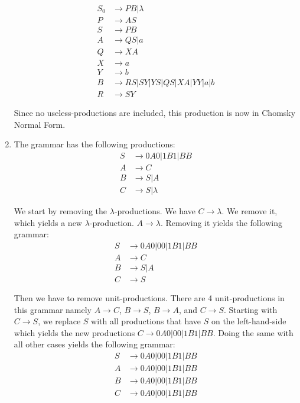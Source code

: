 \begin{enumerate}[label={(\alph*)}]
    \begin{align*}
        S_0 &\rightarrow PB | \lambda\\
        P &\rightarrow AS\\
        S &\rightarrow PB\\
        A &\rightarrow QS | a\\
        Q &\rightarrow XA\\
        X &\rightarrow a\\
        Y &\rightarrow b\\
        B &\rightarrow RS | SY | YS | QS | XA | YY | a | b\\
        R &\rightarrow SY
    \end{align*}
    
    \noindent Since no useless-productions are included, this production is now in Chomsky Normal Form.
    
    \item The grammar has the following productions:\\
    \begin{align*}
        S &\rightarrow 0A0 | 1B1 | BB\\
        A &\rightarrow C\\
        B &\rightarrow S | A\\
        C &\rightarrow S | \lambda
    \end{align*}
    
    \noindent We start by removing the $\lambda$-productions. We have $C \rightarrow \lambda$. We remove it, which yields a new $\lambda$-production. $A \rightarrow \lambda$. Removing it yields the following grammar:
    \begin{align*}
        S &\rightarrow 0A0 | 00| 1B1 | BB\\
        A &\rightarrow C\\
        B &\rightarrow S | A\\
        C &\rightarrow S
    \end{align*}
    
    \noindent Then we have to remove unit-productions. There are 4 unit-productions in this grammar namely $A \rightarrow C$, $B \rightarrow S$, $B \rightarrow A$, and $C \rightarrow S$. Starting with $C \rightarrow S$, we replace $S$ with all productions that have $S$ on the left-hand-side which yields the new productions $C \rightarrow 0A0 | 00| 1B1 | BB$. Doing the same with all other cases yields the following grammar:
    \begin{align*}
        S &\rightarrow 0A0 | 00| 1B1 | BB\\
        A &\rightarrow 0A0 | 00| 1B1 | BB\\
        B &\rightarrow 0A0 | 00| 1B1 | BB\\
        C &\rightarrow 0A0 | 00| 1B1 | BB\\
    \end{align*}
    

\end{enumerate}
